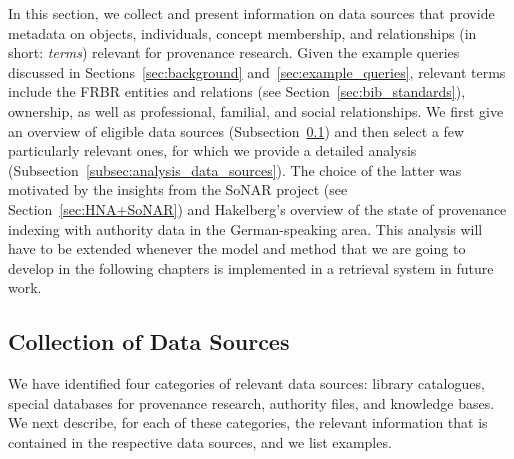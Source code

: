 In this section, we collect and present information on data sources
that provide metadata on objects, individuals, concept membership, and relationships
(in short: \emph{terms})
relevant for provenance research.
Given the example queries discussed in Sections~\ref{sec:background}
and~\ref{sec:example_queries},
relevant terms include
the FRBR entities and relations (see Section~\ref{sec:bib_standards}),
ownership, as well as professional, familial, and social relationships.
We first give an overview of eligible data sources (Subsection~\ref{subsec:collection_data_sources})
and then select a few particularly relevant ones, for which we provide a detailed analysis
(Subsection~\ref{subsec:analysis_data_sources}).
The choice of the latter was motivated by the insights from the \gls{SoNAR} project (see Section~\ref{sec:HNA+SoNAR})
and Hakelberg's \autocite*[§4]{Hakelberg2016} overview of the state of provenance indexing with authority data
in the German-speaking area. This analysis will have to be extended
whenever the model and method that we are going to develop in the following chapters
is implemented in a retrieval system in future work.

\subsection{Collection of Data Sources}
\label{subsec:collection_data_sources}

We have identified four categories of relevant data sources:
library catalogues, special databases for provenance research, authority files, and knowledge bases.
We next describe, for each of these categories, the relevant information that is
contained in the respective data sources, and we list examples.

